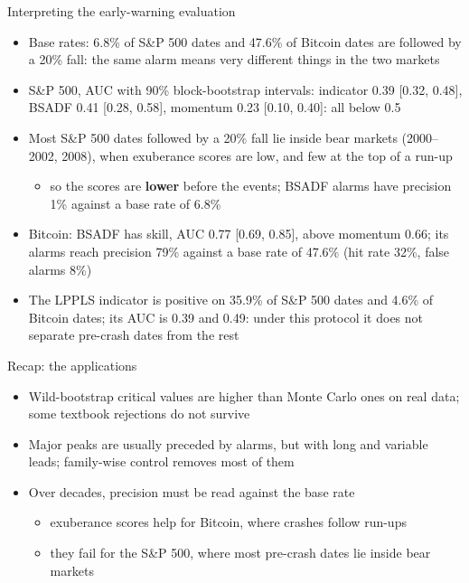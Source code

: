 \begin{frame}{Interpreting the early-warning evaluation}
\itemsize{\footnotesize}
\begin{itemize}
    \item Base rates: 6.8\% of S\&P 500 dates and 47.6\% of Bitcoin dates are followed by a 20\% fall: the same alarm means very different things in the two markets
    \item S\&P 500, AUC with 90\% block-bootstrap intervals: indicator 0.39 [0.32, 0.48], BSADF 0.41 [0.28, 0.58], momentum 0.23 [0.10, 0.40]: all below 0.5
    \item Most S\&P 500 dates followed by a 20\% fall lie inside bear markets (2000--2002, 2008), when exuberance scores are low, and few at the top of a run-up
    \begin{itemize}
        \item so the scores are \textbf{lower} before the events; BSADF alarms have precision 1\% against a base rate of 6.8\%
    \end{itemize}
    \item Bitcoin: BSADF has skill, AUC 0.77 [0.69, 0.85], above momentum 0.66; its alarms reach precision 79\% against a base rate of 47.6\% (hit rate 32\%, false alarms 8\%)
    \item The LPPLS indicator is positive on 35.9\% of S\&P 500 dates and 4.6\% of Bitcoin dates; its AUC is 0.39 and 0.49: under this protocol it does not separate pre-crash dates from the rest
\end{itemize}
\end{frame}

\begin{frame}{Recap: the applications}
\itemsize{\small}
\begin{itemize}
    \item Wild-bootstrap critical values are higher than Monte Carlo ones on real data; some textbook rejections do not survive
    \item Major peaks are usually preceded by alarms, but with long and variable leads; family-wise control removes most of them
    \item Over decades, precision must be read against the base rate
    \begin{itemize}
        \item exuberance scores help for Bitcoin, where crashes follow run-ups
        \item they fail for the S\&P 500, where most pre-crash dates lie inside bear markets
    \end{itemize}
\end{itemize}
\end{frame}


